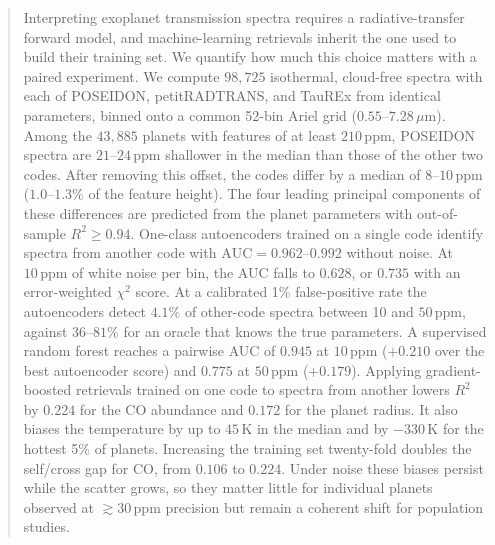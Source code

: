 \begin{abstract}
Interpreting exoplanet transmission spectra requires a radiative-transfer forward model, and machine-learning retrievals inherit the one used to build their training set.
We quantify how much this choice matters with a paired experiment.
We compute $98{,}725$ isothermal, cloud-free spectra with each of POSEIDON, petitRADTRANS, and TauREx from identical parameters, binned onto a common 52-bin Ariel grid ($0.55$--$7.28\,\mu$m).
Among the $43{,}885$ planets with features of at least $210\,\mathrm{ppm}$, POSEIDON spectra are $21$--$24\,\mathrm{ppm}$ shallower in the median than those of the other two codes.
After removing this offset, the codes differ by a median of $8$--$10\,\mathrm{ppm}$ ($1.0$--$1.3\%$ of the feature height).
The four leading principal components of these differences are predicted from the planet parameters with out-of-sample $R^2\geq0.94$.
One-class autoencoders trained on a single code identify spectra from another code with $\mathrm{AUC}=0.962$--$0.992$ without noise.
At $10\,\mathrm{ppm}$ of white noise per bin, the AUC falls to $0.628$, or $0.735$ with an error-weighted $\chi^2$ score.
At a calibrated 1\% false-positive rate the autoencoders detect $4.1\%$ of other-code spectra between 10 and $50\,\mathrm{ppm}$, against $36$--$81\%$ for an oracle that knows the true parameters.
A supervised random forest reaches a pairwise AUC of $0.945$ at $10\,\mathrm{ppm}$ ($+0.210$ over the best autoencoder score) and $0.775$ at $50\,\mathrm{ppm}$ ($+0.179$).
Applying gradient-boosted retrievals trained on one code to spectra from another lowers $R^2$ by $0.224$ for the CO abundance and $0.172$ for the planet radius.
It also biases the temperature by up to $45\,\mathrm{K}$ in the median and by $-330\,\mathrm{K}$ for the hottest 5\% of planets.
Increasing the training set twenty-fold doubles the self/cross gap for CO, from $0.106$ to $0.224$.
Under noise these biases persist while the scatter grows, so they matter little for individual planets observed at $\gtrsim30\,\mathrm{ppm}$ precision but remain a coherent shift for population studies.
\end{abstract}
